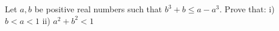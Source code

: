Let $a,b$ be positive real numbers such that $b^3+b\le a-a^3$. Prove that:
i) $b<a<1$
ii) $a^2+b^2<1$